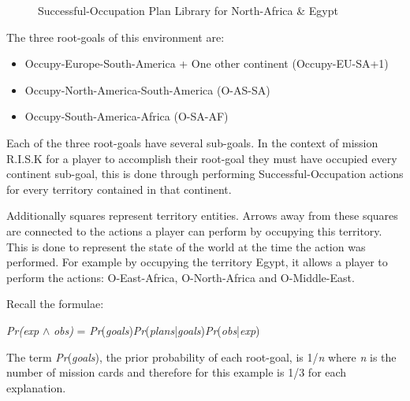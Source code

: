 \documentclass[parskip]{cs4rep}
\begin{document}
\begin{figure}[h]
\caption{Successful-Occupation Plan Library for North-Africa \& Egypt}
\end{figure}

\newpage

The three root-goals of this environment are:

\begin{itemize}
\item
Occupy-Europe-South-America + One other continent (Occupy-EU-SA+1)
\item
Occupy-North-America-South-America (O-AS-SA)
\item
Occupy-South-America-Africa (O-SA-AF)
\end{itemize}

Each of the three root-goals have several sub-goals. In the context of mission R.I.S.K for a player to accomplish their root-goal they must have occupied every continent sub-goal, this is done through performing Successful-Occupation actions for every territory contained in that continent. 

Additionally squares represent territory entities. Arrows away from these squares are connected to the actions a player can perform by occupying this territory. This is done to represent the state of the world at the time the action was performed. For example by occupying the territory Egypt, it allows a player to perform the actions: O-East-Africa, O-North-Africa and O-Middle-East.

Recall the formulae:\newline

\centerline{
\textit{Pr(exp} $\wedge$ \textit{obs)} = \textit{Pr}(\textit{goals})\textit{Pr}(\textit{plans}|\textit{goals})\textit{Pr}(\textit{obs}|\textit{exp})
}

The term \textit{Pr}(\textit{goals}), the prior probability of each root-goal, is 1/\textit{n} where \textit{n} is the number of mission cards and therefore for this example is 1/3 for each explanation. 
\end{document}
